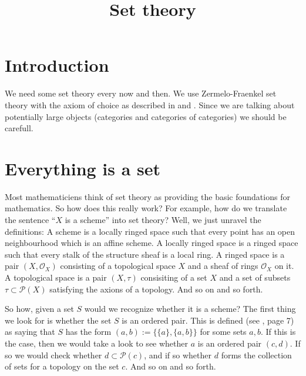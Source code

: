 \documentclass{amsart}
\theoremstyle{definition}
\theoremstyle{remark}
\numberwithin{equation}{subsection}
\begin{document}
\title{Set theory}


\maketitle
\thispagestyle{fancy}

\tableofcontents

\section{Introduction}
\label{section-introduction}

\noindent
We need some set theory every now and then. We use Zermelo-Fraenkel set theory
with the axiom of choice as described in \cite{Kunen} and \cite{Jech}. Since
we are talking about potentially large objects (categories and categories of
categories) we should be carefull.

\section{Everything is a set}
\label{section-sets-everything}

\noindent
Most mathematiciens think of set theory as providing the basic
foundations for mathematics. So how does this really work?
For example, how do we translate the sentence
``$X$ is a scheme'' into set theory? Well, we just unravel the
definitions: A scheme is a locally ringed space such that every
point has an open neighbourhood which is an affine scheme. 
A locally ringed space is a ringed space such that every stalk
of the structure sheaf is a local ring. A ringed space is
a pair $(X, \mathcal{O}_X)$ consisting of a topological space
$X$ and a sheaf of rings $\mathcal{O}_X$ on it. A topological
space is a pair $(X, \tau)$ consisiting of a set
$X$ and a set of subsets $\tau \subset \mathcal{P}(X)$ 
satisfying the axions of a topology. And so on and
so forth.

\medskip\noindent
So how, given a set $S$ would we recognize whether it is a scheme?
The first thing we look for is whether the set $S$ is an ordered pair.
This is defined (see \cite{Jech}, page 7) as saying that $S$
has the form $(a,b) := \{\{a\},\{a,b\}\}$ for some sets $a, b$. If this is
the case, then we would take a look to see whether $a$ is an
ordered pair $(c,d)$. If so we would check whether 
$d \subset \mathcal{P}(c)$, and if so whether $d$ forms the collection
of sets for a topology on the set $c$. And so on and so forth.
\end{document}
